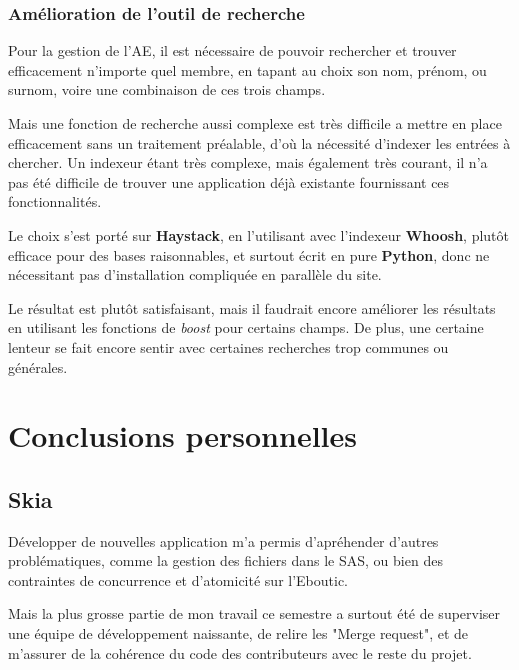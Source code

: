 \documentclass[a4paper]{report}
\begin{document}
\subsection{Amélioration de l'outil de recherche}
\label{sub:amelioration_de_l_outil_de_recherche}
\par Pour la gestion de l'AE, il est nécessaire de pouvoir rechercher et trouver efficacement n'importe quel membre, en
tapant au choix son nom, prénom, ou surnom, voire une combinaison de ces trois champs.

\par Mais une fonction de recherche aussi complexe est très difficile a mettre en place efficacement sans un traitement
préalable, d'où la nécessité d'indexer les entrées à chercher. Un indexeur étant très complexe, mais également très
courant, il n'a pas été difficile de trouver une application déjà existante fournissant ces fonctionnalités.

\par Le choix s'est porté sur \textbf{Haystack}, en l'utilisant avec l'indexeur \textbf{Whoosh}, plutôt efficace pour
des bases raisonnables, et surtout écrit en pure \textbf{Python}, donc ne nécessitant pas d'installation compliquée en
parallèle du site.

\par Le résultat est plutôt satisfaisant, mais il faudrait encore améliorer les résultats en utilisant les fonctions de
\emph{boost} pour certains champs. De plus, une certaine lenteur se fait encore sentir avec certaines recherches trop
communes ou générales.


\chapter{Conclusions personnelles}
\section{Skia}
\label{sec:skia}
\par Développer de nouvelles application m'a permis d'apréhender d'autres problématiques, comme la gestion des fichiers
dans le SAS, ou bien des contraintes de concurrence et d'atomicité sur l'Eboutic.

\par Mais la plus grosse partie de mon travail ce semestre a surtout été de superviser une équipe de développement
naissante, de relire les "Merge request", et de m'assurer de la cohérence du code des contributeurs avec le reste du
projet.
\end{document}
